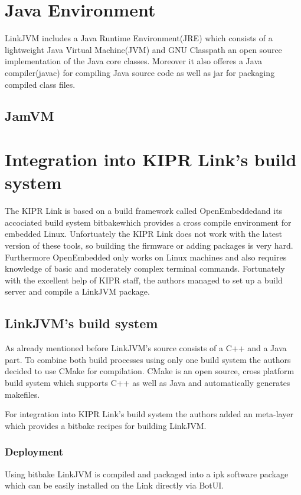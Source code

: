 \documentclass{juniorjournal}
\begin{document}
\section{Java Environment}
LinkJVM includes a Java\cite{Java} Runtime Environment(JRE\cite{JRE}) which consists of a lightweight Java\cite{Java} Virtual Machine(JVM\cite{JVM}) and GNU Classpath\cite{GNU} an open source implementation of the Java\cite{Java} core classes.
Moreover it also offeres a Java\cite{Java} compiler(javac) for compiling Java\cite{Java} source code as well as jar for packaging compiled class files.
\subsection{JamVM}

\section{Integration into KIPR Link's build system}
The KIPR Link is based on a build framework called \frqq OpenEmbedded\flqq and its accociated build system \frqq bitbake\flqq  which provides a cross compile environment for embedded Linux\cite{Look_Inside_Kipr_Link}.
Unfortuately the KIPR Link does not work with the latest version of these tools, so building the firmware or adding packages is very hard.
Furthermore OpenEmbedded only works on Linux machines and also requires knowledge of basic and moderately complex terminal commands.
Fortunately with the excellent help of KIPR staff, the authors managed to set up a build server and compile a LinkJVM package.

\subsection{LinkJVM's build system}
As already mentioned before LinkJVM's source consists of a C++ and a Java part.
To combine both build processes using only one build system the authors decided to use CMake for compilation.
CMake is an open source, cross platform build system which supports C++ as well as Java and automatically generates makefiles.

For integration into KIPR Link's build system the authors added an meta-layer which provides a bitbake recipes for building LinkJVM.

\subsubsection{Deployment}
Using bitbake LinkJVM is compiled and packaged into a ipk software package which can be easily installed on the Link directly via BotUI.
\end{document}
